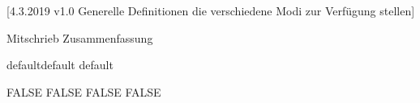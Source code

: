 [4.3.2019 v1.0 Generelle Definitionen die verschiedene Modi zur Verfügung stellen]



\providecommand{\LILLYxMODE}{default}
\providecommand\LILLYxMODExDEFAULT{default}
\providecommand\LILLYxMODExDUMMY{dummy}

\providecommand{\LILLYxBOXxMODE}{DEFAULT}
\providecommand{\LILLYxFOOTERxBUTTONS}{TRUE}

\def\LILLY@Typ@Mitschrieb{Mitschrieb}
\def\LILLY@Typ@Uebungsblatt{Uebungsblatt}
\def\LILLY@Typ@Dokumentation{Dokumentation}
\def\LILLY@Typ@Zusammenfassung{Zusammenfassung}

\ifx\LILLY@Typ\LILLY@Typ@Mitschrieb
    \providecommand{\LILLYxBOXxAufgabexBox}{FALSE}
\fi
\ifx\LILLY@Typ\LILLY@Typ@Zusammenfassung
\RequirePackage{imakeidx} %
\fi


\ifx\LILLYxMODE\LILLYxMODExDEFAULT
    \providecommand\LILLYxBOXxBeispielxBox{FALSE}
\else\ifx\LILLYxMODE\LILLYxMODExPRINT
    
    \renewcommand{\LILLYxFOOTERxBUTTONS}{FALSE}
    \providecommand{\LILLYxHYPERLINK}{FALSE}
    \providecommand\LILLYxBOXxBemerkungxBox{FALSE}
    \providecommand\LILLYxBOXxBeweisxBox{FALSE}
    \providecommand\LILLYxBOXxBeispielxBox{FALSE}
    \providecommand\LILLYxBOXxLemmaxBox{FALSE}
    \raggedbottom  %
\fi\fi 


\ifx\LILLYxMODExEXTRA\true %
\else
\fi


\ifx\LILLYxBOXxBeispielxBox\true\else\renewcommand{\LILLYxColorxBeispiel}{Charcoal}\fi
\ifx\LILLYxBOXxBeweisxBox\true\else\renewcommand{\LILLYxColorxBeweis}{Charcoal}\fi
\ifx\LILLYxBOXxBemerkungxBox\true\else\renewcommand{\LILLYxColorxBemerkung}{Charcoal}\fi
\ifx\LILLYxBOXxLemmaxBox\true\else\renewcommand{\LILLYxColorxLemma}{Charcoal}\fi





